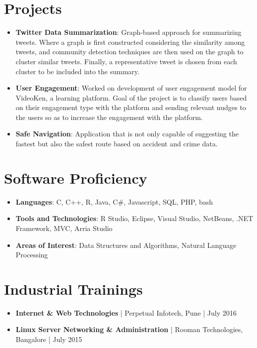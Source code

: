 \documentclass[letterpaper,11pt]{article}
\newcommand{\resumeItem}[2]{
  \item\small{
    \textbf{#1}{: #2 \vspace{-2pt}}
  }
}
\newcommand{\resumeSubItem}[2]{\resumeItem{#1}{#2}\vspace{-4pt}}
\newcommand{\resumeSubHeadingListStart}{\begin{itemize}[leftmargin=*]}
\newcommand{\resumeSubHeadingListEnd}{\end{itemize}}
\begin{document}
\section{Projects}
  \resumeSubHeadingListStart
    \resumeSubItem{Twitter Data Summarization}
      {Graph-based approach for summarizing tweets. Where a graph is first constructed considering the similarity among tweets, and community detection techniques are then used on the graph to cluster similar tweets. Finally, a representative tweet is chosen from each cluster to be included into the summary.}
    \resumeSubItem{User Engagement}
      {Worked on development of user engagement model for VideoKen, a learning platform. Goal of the project is to classify users based on their engagement type with the platform and sending relevant nudges to the users so as to increase the engagement with the platform.
      }
    \resumeSubItem{Safe Navigation}
      {Application that is not only capable of suggesting the fastest but also the safest route based on accident and crime data.}
  \resumeSubHeadingListEnd

\section{Software Proficiency}
  \resumeSubHeadingListStart
    \resumeSubItem{Languages}
      {C, C++, R, Java, C\#, Javascript, SQL, PHP, bash}
    \resumeSubItem{Tools and Technologies}
      {R Studio, Eclipse, Visual Studio, NetBeans, .NET Framework, MVC, Arria Studio}
    \resumeSubItem{Areas of Interest}
      {Data Structures and Algorithms, Natural Language Processing}
  \resumeSubHeadingListEnd
  

\section{Industrial Trainings}
\resumeSubHeadingListStart
    \itemsep-0.25em 
    \item{
      \textbf{Internet \& Web Technologies}{ | Perpetual Infotech, Pune | July 2016 }
    }
    \item{
      \textbf{Linux Server Networking \& Administration}{ | Rooman Technologies, Bangalore | July 2015}
    }
  \resumeSubHeadingListEnd


\end{document}
